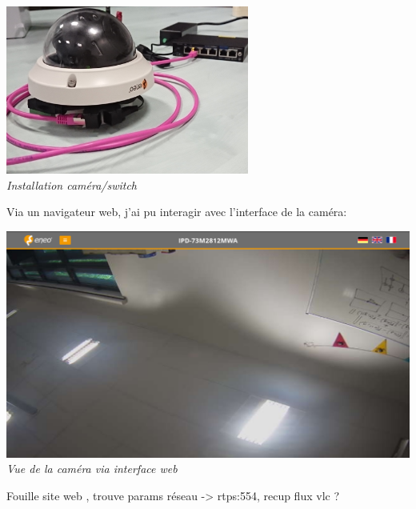 \documentclass[12pt, french]{report}
\begin{document}
\begin{center}
    \includegraphics[width=0.6\textwidth]{Dimensionnement/camsw.png}\\
    \textit{Installation caméra/switch}\\
\end{center}

Via un navigateur web, j'ai pu interagir avec l'interface de la caméra:
\begin{center}
\includegraphics[width=\textwidth]{Cameras/WebSiteView.png}\\
\textit{Vue de la caméra via interface web}\\
\end{center}

Fouille site web , trouve params réseau -> rtps:554, recup flux vlc ?
























\newpage
\end{document}
